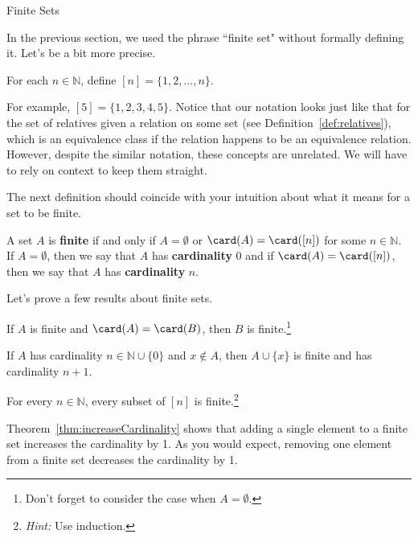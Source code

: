 \begin{section}{Finite Sets}

In the previous section, we used the phrase ``finite set" without formally defining it. Let's be a bit more precise.

\begin{definition}
For each $n\in \mathbb{N}$, define $[n]=\{1,2,\ldots,n\}$.
\end{definition}

For example, $[5]=\{1,2,3,4,5\}$.  Notice that our notation looks just like that for the set of relatives given a relation on some set (see Definition~\ref{def:relatives}), which is an equivalence class if the relation happens to be an equivalence relation.  However, despite the similar notation, these concepts are unrelated. We will have to rely on context to keep them straight.

The next definition should coincide with your intuition about what it means for a set to be finite.

\begin{definition}
A set $A$ is \textbf{finite} if and only if $A=\emptyset$ or $\card(A)=\card([n])$ for some $n\in\mathbb{N}$. If $A=\emptyset$, then we say that $A$ has \textbf{cardinality} 0 and if $\card(A)=\card([n])$, then we say that $A$ has \textbf{cardinality} $n$.
\end{definition}

Let's prove a few results about finite sets.

\begin{theorem}\label{thm:finiteSetsSameCardinality}
If $A$ is finite and $\card(A)=\card(B)$, then $B$ is finite.\footnote{Don't forget to consider the case when $A=\emptyset$.}
\end{theorem}

\begin{theorem}\label{thm:increaseCardinality}
If $A$ has cardinality $n\in\mathbb{N}\cup\{0\}$ and $x\notin A$, then $A\cup\{x\}$ is finite and has cardinality $n+1$.
\end{theorem}

\begin{theorem}\label{thm:subsetsFiniteSets}
For every $n\in\mathbb{N}$, every subset of $[n]$ is finite.\footnote{\emph{Hint:} Use induction.}
\end{theorem}

Theorem~\ref{thm:increaseCardinality} shows that adding a single element to a finite set increases the cardinality by 1. As you would expect, removing one element from a finite set decreases the cardinality by 1.


\end{section}
